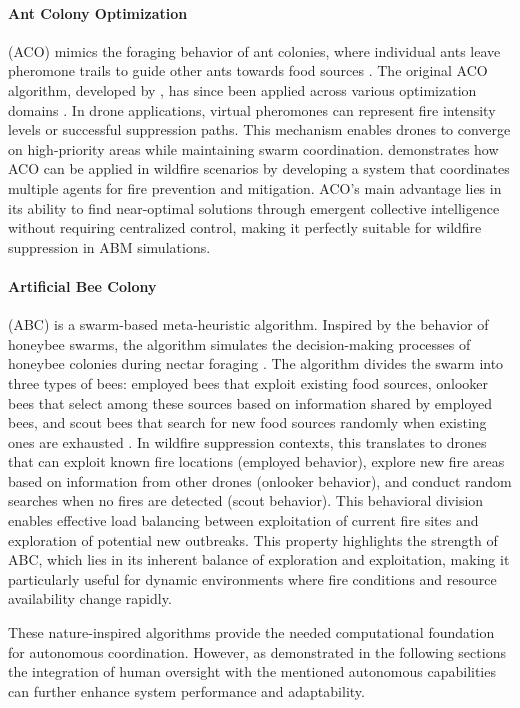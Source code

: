 \documentclass[11pt, a4paper]{article}
\begin{document}
\paragraph{Ant Colony Optimization} (ACO) mimics the foraging behavior of ant colonies, where individual ants leave pheromone trails to guide other ants towards food sources \citep{ACO}. The original ACO algorithm, developed by \citet*{ACO}, has since been applied across various optimization domains \citep{ACO_recent_advances}.
In drone applications, virtual pheromones can represent fire intensity levels or successful suppression paths. This mechanism enables drones to converge on high-priority areas while maintaining swarm coordination.
\citet*{HybridAntColonyWildfire} demonstrates how ACO can be applied in wildfire scenarios by developing a system that coordinates multiple agents for fire prevention and mitigation. ACO's main advantage lies in its ability to find near-optimal solutions through emergent collective intelligence without requiring centralized control, making it perfectly suitable for wildfire suppression in ABM simulations.


\paragraph{Artificial Bee Colony} (ABC) is a swarm-based meta-heuristic algorithm. Inspired by the behavior of honeybee swarms, the algorithm simulates the decision-making processes of honeybee colonies during nectar foraging \citep{karaboga2007abc}. The algorithm divides the swarm into three types of bees: employed bees that exploit existing food sources, onlooker bees that select among these sources based on information shared by employed bees, and scout bees that search for new food sources randomly when existing ones are exhausted \citep{karaboga2007abc}.
In wildfire suppression contexts, this translates to drones that can exploit known fire locations (employed behavior), explore new fire areas based on information from other drones (onlooker behavior), and conduct random searches when no fires are detected (scout behavior). This behavioral division enables effective load balancing between exploitation of current fire sites and exploration of potential new outbreaks. This property highlights the strength of ABC, which lies in its inherent balance of exploration and exploitation, making it particularly useful for dynamic environments where fire conditions and resource availability change rapidly.

These nature-inspired algorithms provide the needed computational foundation for autonomous coordination. However, as demonstrated in the following sections the integration of human oversight with the mentioned autonomous capabilities can further enhance system performance and adaptability.
\end{document}
